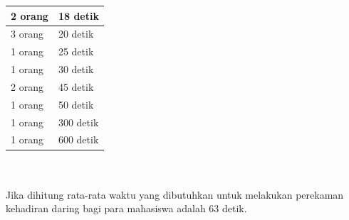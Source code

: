 \documentclass[a4paper,twoside]{article}
\begin{document}
\begin{enumerate}
\begin{enumerate}
\begin{tabular}{|p{4cm} |p{7cm}|}
				2 orang &  18 detik\\ \hline 
				3 orang &  20 detik\\ \hline
				1 orang &  25 detik\\ \hline 
				1 orang &  30 detik\\ \hline 
				2 orang &  45 detik\\ \hline
				1 orang &  50 detik\\ \hline 
				1 orang &  300 detik\\ \hline 
				1 orang &  600 detik\\ \hline
			\end{tabular}\\ \\
			Jika dihitung rata-rata waktu yang dibutuhkan untuk melakukan perekaman kehadiran daring bagi para mahasiswa adalah 63 detik.
			

\end{enumerate}
\end{enumerate}
\end{document}
